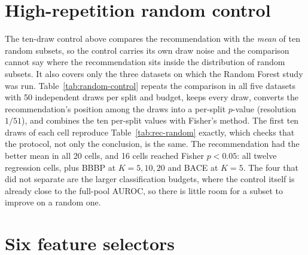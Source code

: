 \documentclass[10pt,a4paper]{article}
\begin{document}
\section*{High-repetition random control}

The ten-draw control above compares the recommendation with the \emph{mean} of ten random subsets, so the control carries its own draw noise and the comparison cannot say where the recommendation sits inside the distribution of random subsets. It also covers only the three datasets on which the Random Forest study was run. Table~\ref{tab:random-control} repeats the comparison in all five datasets with 50 independent draws per split and budget, keeps every draw, converts the recommendation's position among the draws into a per-split $p$-value (resolution $1/51$), and combines the ten per-split values with Fisher's method. The first ten draws of each cell reproduce Table~\ref{tab:rec-random} exactly, which checks that the protocol, not only the conclusion, is the same. The recommendation had the better mean in all 20 cells, and 16 cells reached Fisher $p<0.05$: all twelve regression cells, plus BBBP at $K=5,10,20$ and BACE at $K=5$. The four that did not separate are the larger classification budgets, where the control itself is already close to the full-pool AUROC, so there is little room for a subset to improve on a random one.



\section*{Six feature selectors}
\end{document}
